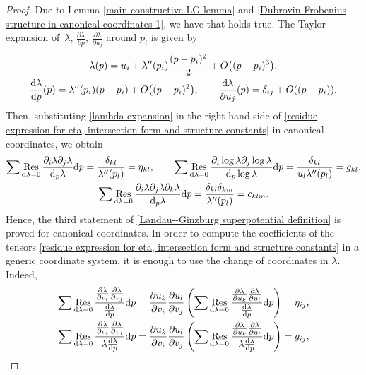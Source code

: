 \documentclass[11pt]{article}
\numberwithin{equation}{section}
\numberwithin{equation}{section}
\DeclareMathOperator*{\res}{Res}
\begin{document}
\begin{proof}
Due to Lemma \ref{main constructive LG lemma} and \eqref{Dubrovin Frobenius structure in canonical coordinates 1}, we have that
holds true. The Taylor expansion of~$\lambda$, $\frac{\partial \lambda}{\partial p}$, $\frac{\partial \lambda}{\partial u_j}$ around $p_i$ is given by
\begin{gather}
\lambda(p)=u_i+\lambda^{\prime\prime}(p_i)\frac{(p-p_i)^2}{2}+O\bigl( (p-p_i)^3\bigr),\nonumber\\
\frac{{\rm d} \lambda}{{\rm d}p}(p)=\lambda^{\prime\prime}(p_i)(p-p_i)+O\bigl( (p-p_i)^2\bigr),\qquad
\frac{{\rm d} \lambda}{\partial u_j}(p)=\delta_{ij}+O( (p-p_i)).\label{lambda expansion}
\end{gather}
Then, substituting \eqref{lambda expansion} in the right-hand side of \eqref{residue expression for eta, intersection form and structure constants} in canonical coordinates, we obtain
\begin{gather*}%
 \sum \res_{{\rm d}\lambda=0} \frac{ \partial_i\lambda \partial_j\lambda }{{\rm d}_p\lambda }{\rm d}p =\frac{\delta_{kl}}{\lambda^{\prime\prime}(p_l)}=\eta_{kl},\qquad
\sum \res_{{\rm d}\lambda=0} \frac{ \partial_i\log\lambda \partial_j\log\lambda }{{\rm d}_p\log\lambda} {\rm d}p =\frac{\delta_{kl}}{u_l\lambda^{\prime\prime}(p_l)}=g_{kl},\\
\sum \res_{{\rm d}\lambda=0} \frac{ \partial_i\lambda \partial_j\lambda \partial_k\lambda }{{\rm d}_p\lambda}{\rm d}p=\frac{\delta_{kl}\delta_{km}}{\lambda^{\prime\prime}(p_l)}=c_{klm}.
\end{gather*}
Hence, the third statement of \ref{Landau--Ginzburg superpotential definition} is proved for canonical coordinates. In order to compute the coefficients of the tensors \eqref{residue expression for eta, intersection form and structure constants} in a generic coordinate system, it is enough to use the change of coordinates in $\lambda$. Indeed,
\begin{gather*}%
\sum \res_{{\rm d}\lambda=0} \frac{\frac{\partial\lambda}{\partial v_i}\frac{\partial\lambda}{\partial v_j} }{\frac{{\rm d}\lambda}{{\rm d}p} }{\rm d}p=\frac{\partial u_k}{\partial v_i}\frac{\partial u_l}{\partial v_j}\left(\sum \res_{{\rm d}\lambda=0} \frac{\frac{\partial\lambda}{\partial u_k}\frac{\partial\lambda}{\partial u_l} }{\frac{{\rm d}\lambda}{{\rm d}p} }{\rm d}p \right)=\eta_{ij},\\
\sum \res_{{\rm d}\lambda=0} \frac{\frac{\partial\lambda}{\partial v_i}\frac{\partial\lambda}{\partial v_j} }{\lambda\frac{{\rm d}\lambda}{{\rm d}p} }{\rm d}p=\frac{\partial u_k}{\partial v_i}\frac{\partial u_l}{\partial v_j}\left(\sum \res_{{\rm d}\lambda=0} \frac{\frac{\partial\lambda}{\partial u_k}\frac{\partial\lambda}{\partial u_l} }{\lambda \frac{{\rm d}\lambda}{{\rm d}p} }{\rm d}p\right)=g_{ij} ,\\

\end{gather*}
\end{proof}
\end{document}
